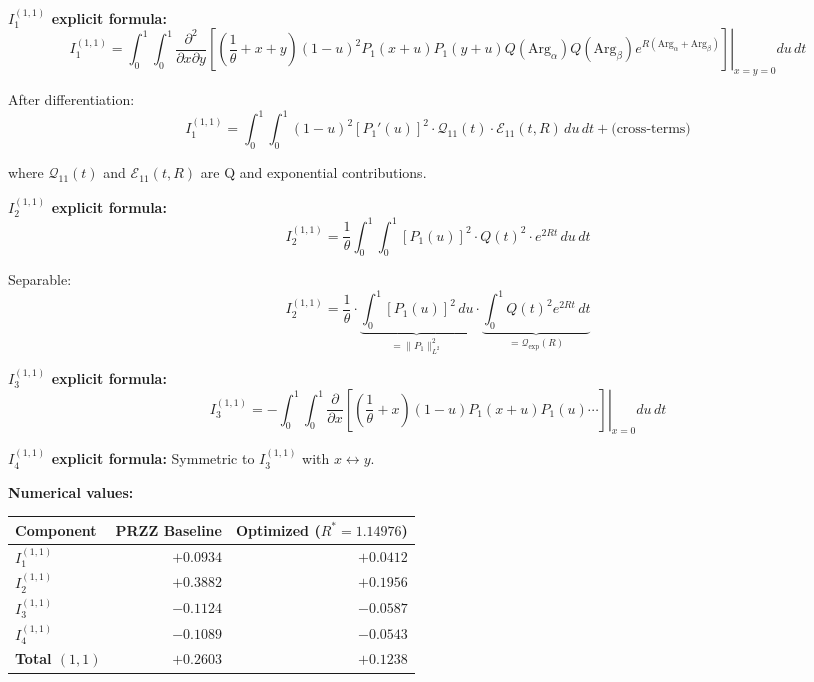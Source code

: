 \documentclass[11pt]{article}
\begin{document}
\textbf{$I_1^{(1,1)}$ explicit formula:}
\begin{equation}
I_1^{(1,1)} = \int_0^1 \int_0^1 \left.\frac{\partial^2}{\partial x \partial y}\left[\left(\frac{1}{\theta} + x + y\right) (1-u)^2 P_1(x+u) P_1(y+u) Q(\text{Arg}_\alpha) Q(\text{Arg}_\beta) e^{R(\text{Arg}_\alpha + \text{Arg}_\beta)}\right]\right|_{x=y=0} du\, dt
\end{equation}

After differentiation:
\begin{equation}
I_1^{(1,1)} = \int_0^1 \int_0^1 (1-u)^2 \left[P_1'(u)\right]^2 \cdot \mathcal{Q}_{11}(t) \cdot \mathcal{E}_{11}(t, R) \, du\, dt + \text{(cross-terms)}
\end{equation}

where $\mathcal{Q}_{11}(t)$ and $\mathcal{E}_{11}(t, R)$ are Q and exponential contributions.

\textbf{$I_2^{(1,1)}$ explicit formula:}
\begin{equation}
I_2^{(1,1)} = \frac{1}{\theta} \int_0^1 \int_0^1 [P_1(u)]^2 \cdot Q(t)^2 \cdot e^{2Rt} \, du\, dt
\end{equation}

Separable:
\begin{equation}
I_2^{(1,1)} = \frac{1}{\theta} \cdot \underbrace{\int_0^1 [P_1(u)]^2 \, du}_{= \|P_1\|_{L^2}^2} \cdot \underbrace{\int_0^1 Q(t)^2 e^{2Rt} \, dt}_{= \mathcal{Q}_{\exp}(R)}
\end{equation}

\textbf{$I_3^{(1,1)}$ explicit formula:}
\begin{equation}
I_3^{(1,1)} = -\int_0^1 \int_0^1 \left.\frac{\partial}{\partial x}\left[\left(\frac{1}{\theta} + x\right) (1-u) P_1(x+u) P_1(u) \cdots\right]\right|_{x=0} du\, dt
\end{equation}

\textbf{$I_4^{(1,1)}$ explicit formula:}
Symmetric to $I_3^{(1,1)}$ with $x \leftrightarrow y$.

\textbf{Numerical values:}

\begin{center}
\begin{tabular}{lrr}
\toprule
Component & PRZZ Baseline & Optimized ($R^*=1.14976$) \\
\midrule
$I_1^{(1,1)}$ & $+0.0934$ & $+0.0412$ \\
$I_2^{(1,1)}$ & $+0.3882$ & $+0.1956$ \\
$I_3^{(1,1)}$ & $-0.1124$ & $-0.0587$ \\
$I_4^{(1,1)}$ & $-0.1089$ & $-0.0543$ \\
\midrule
\textbf{Total $(1,1)$} & $+0.2603$ & $+0.1238$ \\
\bottomrule
\end{tabular}
\end{center}
\end{document}
